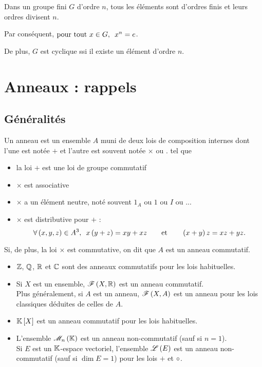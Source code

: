\begin{cor}
Dans un groupe fini \(G\) d'ordre \(n\), tous les éléments sont d'ordres finis et leurs ordres divisent \(n\).

Par conséquent, \(\quantifs{\tpt x\in G}x^n=e\).

De plus, \(G\) est cyclique ssi il existe un élément d'ordre \(n\).
\end{cor}

\section{Anneaux : rappels}

\subsection{Généralités}

\begin{defi}
Un anneau est un ensemble \(A\) muni de deux lois de composition internes dont l'une est notée \(+\) et l'autre est souvent notée \(\times\) ou \(.\) tel que

\begin{itemize}
    \item la loi \(+\) est une loi de groupe commutatif \\
    \item \(\times\) est associative \\
    \item \(\times\) a un élément neutre, noté souvent \(1_A\) ou \(1\) ou \(I\) ou ... \\
    \item \(\times\) est distributive pour \(+\) : \[\quantifs{\forall\paren{x,y,z}\in A^3}x\paren{y+z}=xy+xz\qquad\text{et}\qquad\paren{x+y}z=xz+yz.\]
\end{itemize}

Si, de plus, la loi \(\times\) est commutative, on dit que \(A\) est un anneau commutatif.
\end{defi}

\begin{ex}
\begin{itemize}
    \item \(\mathbb{Z}\), \(\mathbb{Q}\), \(\mathbb{R}\) et \(\mathbb{C}\) sont des anneaux commutatifs pour les lois habituelles. \\
    \item Si \(X\) est un ensemble, \(\mathscr{F}\left(X,\mathbb{R}\right)\) est un anneau commutatif. \\ Plus généralement, si \(A\) est un anneau, \(\mathscr{F}\left(X,A\right)\) est un anneau pour les lois classiques déduites de celles de \(A\). \\
    \item \(\poly\) est un anneau commutatif pour les lois habituelles. \\
    \item L'ensemble \(\M{n}\) est un anneau non-commutatif (sauf si \(n=1\)). \\ Si \(E\) est un \(\mathbb{K}\)-espace vectoriel, l'ensemble \(\mathscr{L}\left(E\right)\) est un anneau non-commutatif (sauf si \(\dim E=1\)) pour les lois \(+\) et \(\circ\).
\end{itemize}
\end{ex}

